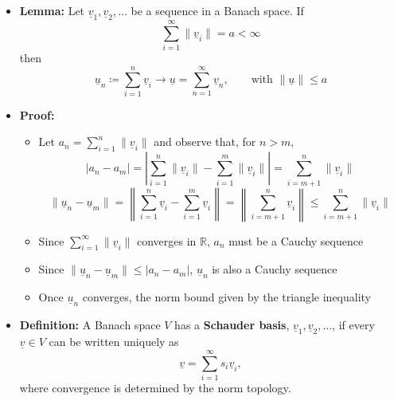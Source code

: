\documentclass[11pt,twoside]{report}
\newcommand{\bbR}{{\mathbb{R}}}
\newcommand{\vecnot}{\underline}
\begin{document}
\begin{itemize}
\begin{itemize}
\item Absolute summability implies convergence 
\[
\sum_{i=1}^\infty |a_i| < \infty \quad  \quad \implies \quad  \sum_{i=n}^\infty  |a_i| \to  0 \quad \implies \quad b_n \to 0
\]

\end{itemize}


\item \textbf{Lemma:} Let $\vecnot{v}_1, \vecnot{v}_2, \dots$ be a sequence in a Banach space. 
If 
\[
\sum_{i=1}^\infty \| \vecnot{v}_i \| =  a <\infty
\]
then %
\[
\vecnot{u}_n\coloneqq   \sum_{i=1}^n \vecnot{v}_i  \to\vecnot{u} = \sum_{n=1}^\infty \vecnot{v}_n , \qquad \text{with $\| \vecnot{u} \| \leq  a$}
\]


\item \textbf{Proof:} 

\begin{itemize}
\item Let $a_n = \sum_{i=1}^n \| \vecnot{v}_i \|$ and observe that, for $n\!>\!m$, 
\[ |a_n - a_m| = \left| \sum_{i=1}^n \| \vecnot{v}_i \| - \sum_{i=1}^m \| \vecnot{v}_i \|  \right| = \sum_{i=m+1}^n \| \vecnot{v}_i \| \] 
\vspace{-2mm}
\[ \|\vecnot{u}_n - \vecnot{u}_m \| = \left\| \sum_{i=1}^n \vecnot{v}_i - \sum_{i=1}^m \vecnot{v}_i  \right\| = \left\| \sum_{i=m+1}^n \vecnot{v}_i \right\| \leq \sum_{i=m+1}^n \| \vecnot{v}_i \| \] 

\item Since $\sum_{i=1}^\infty \| \vecnot{v}_i \|$ converges in $\bbR$, $a_n$ must be a Cauchy sequence 

\item Since $\|\vecnot{u}_n - \vecnot{u}_m\| \leq |a_n - a_m|$, $\vecnot{u}_n$ is also a Cauchy sequence 

\item Once $\vecnot{u}_n$ converges, the norm bound given by the triangle inequality \hfill \qedhere

\end{itemize}



\item \textbf{Definition:} A Banach space $V$ has a \textbf{Schauder basis}, $\vecnot{v}_1, \vecnot{v}_2, \ldots$, if every $\vecnot{v} \in V$ can be written uniquely as
\[ \vecnot{v} = \sum_{i=1}^\infty s_i \vecnot{v}_i, \]
where convergence is determined by the norm topology. 



\end{itemize}
\end{document}
